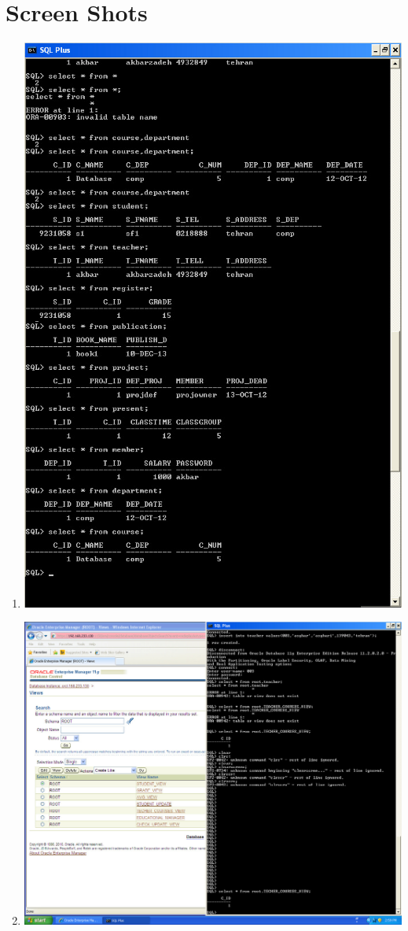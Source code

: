 \documentclass{article}
\begin{document}
\section{Screen Shots}
\begin{enumerate}
	\item
		\includegraphics[scale=0.4]{figs/1.jpg}
	\item
		\includegraphics[scale=0.4]{figs/2.jpg}

\end{enumerate}
\end{document}
